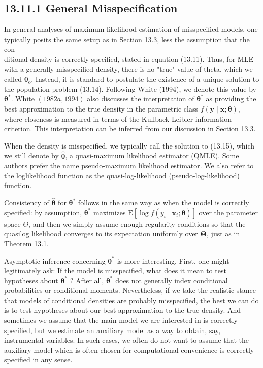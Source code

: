 \documentclass[10pt]{article}
\begin{document}
\subsection*{13.11.1 General Misspecification}
In general analyses of maximum likelihood estimation of misspecified models, one typically posits the same setup as in Section 13.3, less the assumption that the con-\\
ditional density is correctly specified, stated in equation (13.11). Thus, for MLE with a generally misspecified density, there is no "true" value of theta, which we called $\boldsymbol{\theta}_{\mathrm{o}}$. Instead, it is standard to postulate the existence of a unique solution to the population problem (13.14). Following White (1994), we denote this value by $\boldsymbol{\theta}^{*}$. White $(1982 a, 1994)$ also discusses the interpretation of $\boldsymbol{\theta}^{*}$ as providing the best approximation to the true density in the parametric class $f(\mathbf{y} \mid \mathbf{x} ; \boldsymbol{\theta})$, where closeness is measured in terms of the Kullback-Leibler information criterion. This interpretation can be inferred from our discussion in Section 13.3.

When the density is misspecified, we typically call the solution to (13.15), which we still denote by $\hat{\boldsymbol{\theta}}$, a quasi-maximum likelihood estimator (QMLE). Some authors prefer the name pseudo-maximum likelihood estimator. We also refer to the loglikelihood function as the quasi-log-likelihood (pseudo-log-likelihood) function.

Consistency of $\hat{\boldsymbol{\theta}}$ for $\boldsymbol{\theta}^{*}$ follows in the same way as when the model is correctly specified: by assumption, $\boldsymbol{\theta}^{*}$ maximizes $\mathrm{E}\left[\log f\left(y_{i} \mid \mathbf{x}_{i} ; \boldsymbol{\theta}\right)\right]$ over the parameter space $\Theta$, and then we simply assume enough regularity conditions so that the quasilog likelihood converges to its expectation uniformly over $\boldsymbol{\Theta}$, just as in Theorem 13.1.

Asymptotic inference concerning $\boldsymbol{\theta}^{*}$ is more interesting. First, one might legitimately ask: If the model is misspecified, what does it mean to test hypotheses about $\boldsymbol{\theta}^{*}$ ? After all, $\boldsymbol{\theta}^{*}$ does not generally index conditional probabilities or conditional moments. Nevertheless, if we take the realistic stance that models of conditional densities are probably misspecified, the best we can do is to test hypotheses about our best approximation to the true density. And sometimes we assume that the main model we are interested in is correctly specified, but we estimate an auxiliary model as a way to obtain, say, instrumental variables. In such cases, we often do not want to assume that the auxiliary model-which is often chosen for computational convenience-is correctly specified in any sense.
\end{document}

